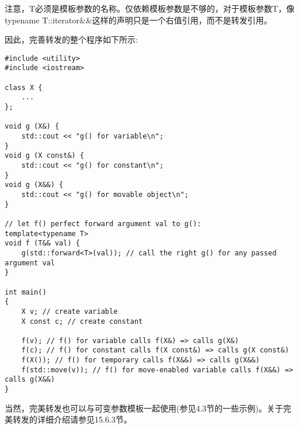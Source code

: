 注意，T必须是模板参数的名称。仅依赖模板参数是不够的，对于模板参数T，像typename T::iterator\&\&这样的声明只是一个右值引用，而不是转发引用。

因此，完善转发的整个程序如下所示:

\begin{lstlisting}[style=styleCXX]
#include <utility>
#include <iostream>

class X {
	...
};

void g (X&) {
	std::cout << "g() for variable\n";
}
void g (X const&) {
	std::cout << "g() for constant\n";
}
void g (X&&) {
	std::cout << "g() for movable object\n";
}

// let f() perfect forward argument val to g():
template<typename T>
void f (T&& val) {
	g(std::forward<T>(val)); // call the right g() for any passed argument val
}

int main()
{
	X v; // create variable
	X const c; // create constant
	
	f(v); // f() for variable calls f(X&) => calls g(X&)
	f(c); // f() for constant calls f(X const&) => calls g(X const&)
	f(X()); // f() for temporary calls f(X&&) => calls g(X&&)
	f(std::move(v)); // f() for move-enabled variable calls f(X&&) => calls g(X&&)
}
\end{lstlisting}

当然，完美转发也可以与可变参数模板一起使用(参见4.3节的一些示例)。关于完美转发的详细介绍请参见15.6.3节。






